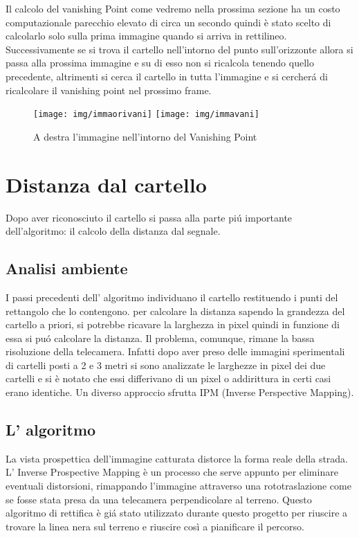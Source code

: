 		Il calcolo del vanishing Point come vedremo nella prossima sezione ha un costo computazionale parecchio elevato di circa un secondo quindi è stato scelto di calcolarlo solo sulla prima immagine quando si arriva in rettilineo. Successivamente se si trova il cartello nell'intorno del punto sull'orizzonte allora si passa alla prossima immagine e su di esso non si ricalcola tenendo quello precedente, altrimenti si cerca il cartello in tutta l'immagine e si cercher\'a di ricalcolare il vanishing point nel prossimo frame.

		\begin{figure}[!ht]
			\centering
			\texttt{[image: img/immaorivani]}
			\texttt{[image: img/immavani]}
			\caption[Esempio vanishin Point calcolato]{A destra l'immagine nell'intorno del Vanishing Point}
		\end{figure}

\section{Distanza dal cartello}
	
	Dopo aver riconosciuto il cartello si passa alla parte pi\'u importante dell'algoritmo: il calcolo della distanza dal segnale.

	\subsection{Analisi ambiente}

		I passi precedenti dell' algoritmo individuano il cartello restituendo i punti del rettangolo che lo contengono. per calcolare la distanza sapendo la grandezza del cartello a priori, si potrebbe ricavare la larghezza in pixel quindi in funzione di essa si pu\'o calcolare la distanza. Il problema, comunque, rimane la bassa risoluzione della telecamera. Infatti dopo aver preso delle immagini sperimentali di cartelli posti a 2 e 3 metri si sono analizzate le larghezze in pixel dei due cartelli e si è notato che essi differivano di un pixel o addirittura in certi casi erano identiche. Un diverso approccio sfrutta IPM (Inverse Perspective Mapping).
		
	\subsection{L' algoritmo}

		La vista prospettica dell'immagine catturata distorce la forma reale della strada. L' Inverse Prospective Mapping è un processo che serve appunto per eliminare eventuali distorsioni, rimappando l'immagine attraverso una rototraslazione come se fosse stata presa da una telecamera perpendicolare al terreno. Questo algoritmo di rettifica è gi\'a stato utilizzato durante questo progetto\cite{Rettifica} per riuscire a trovare la linea nera sul terreno e riuscire così a pianificare il percorso.


